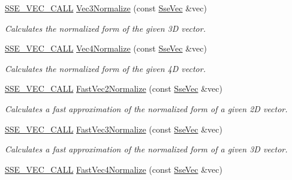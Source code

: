 \begin{DoxyCompactItemize}
\hyperlink{ssevec__math__defs_8h_a97454f977a5281455cecacce1e8ba670}{S\+S\+E\+\_\+\+V\+E\+C\+\_\+\+C\+A\+L\+L} \hyperlink{group___s_i_m_d_vec_math_ga652e2847e6f220ff53c1e99ffe14c68c}{Vec3\+Normalize} (const \hyperlink{namespacegofxmath_a634570ddcd2496053ee966227080e02f}{Sse\+Vec} \&vec)
\begin{DoxyCompactList}\small\item\em Calculates the normalized form of the given 3\+D vector. \end{DoxyCompactList}\item 
\hyperlink{ssevec__math__defs_8h_a97454f977a5281455cecacce1e8ba670}{S\+S\+E\+\_\+\+V\+E\+C\+\_\+\+C\+A\+L\+L} \hyperlink{group___s_i_m_d_vec_math_ga426569dc94583afda5006317993642df}{Vec4\+Normalize} (const \hyperlink{namespacegofxmath_a634570ddcd2496053ee966227080e02f}{Sse\+Vec} \&vec)
\begin{DoxyCompactList}\small\item\em Calculates the normalized form of the given 4\+D vector. \end{DoxyCompactList}\item 
\hyperlink{ssevec__math__defs_8h_a97454f977a5281455cecacce1e8ba670}{S\+S\+E\+\_\+\+V\+E\+C\+\_\+\+C\+A\+L\+L} \hyperlink{group___s_i_m_d_vec_math_gaebbcf811d495f5e61c17624041e7c6d4}{Fast\+Vec2\+Normalize} (const \hyperlink{namespacegofxmath_a634570ddcd2496053ee966227080e02f}{Sse\+Vec} \&vec)
\begin{DoxyCompactList}\small\item\em Calculates a fast approximation of the normalized form of a given 2\+D vector. \end{DoxyCompactList}\item 
\hyperlink{ssevec__math__defs_8h_a97454f977a5281455cecacce1e8ba670}{S\+S\+E\+\_\+\+V\+E\+C\+\_\+\+C\+A\+L\+L} \hyperlink{group___s_i_m_d_vec_math_gab94457a45f418afc149535de9bc04ba1}{Fast\+Vec3\+Normalize} (const \hyperlink{namespacegofxmath_a634570ddcd2496053ee966227080e02f}{Sse\+Vec} \&vec)
\begin{DoxyCompactList}\small\item\em Calculates a fast approximation of the normalized form of a given 3\+D vector. \end{DoxyCompactList}\item 
\hyperlink{ssevec__math__defs_8h_a97454f977a5281455cecacce1e8ba670}{S\+S\+E\+\_\+\+V\+E\+C\+\_\+\+C\+A\+L\+L} \hyperlink{group___s_i_m_d_vec_math_ga293b1bddb59e19059c55c7e91475dc45}{Fast\+Vec4\+Normalize} (const \hyperlink{namespacegofxmath_a634570ddcd2496053ee966227080e02f}{Sse\+Vec} \&vec)

\end{DoxyCompactItemize}
